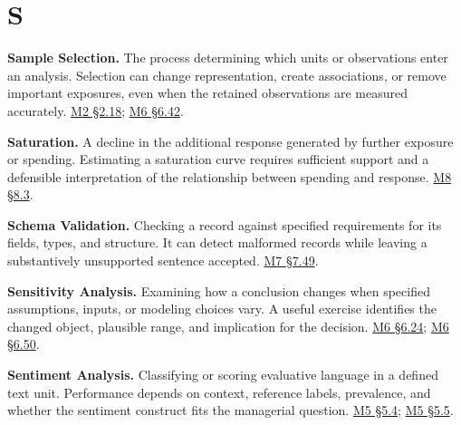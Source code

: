 \par{}
\hypertarget{module-s}{%
\section*{S}\label{module-s}}

\noindent\textbf{Sample Selection.} The process determining which units or
observations enter an analysis. Selection can change representation,
create associations, or remove important exposures, even when the
retained observations are measured accurately.
\href{Marketing_Analytics_Lecture_Notes.pdf\#M02-sample-restrictions-and-customer-representation}{M2
§2.18};
\href{Marketing_Analytics_Lecture_Notes.pdf\#M06-thoughtful-design-before-convenient-data}{M6
§6.42}.

\noindent\textbf{Saturation.} A decline in the additional response generated by
further exposure or spending. Estimating a saturation curve requires
sufficient support and a defensible interpretation of the relationship
between spending and response.
\href{Marketing_Analytics_Lecture_Notes.pdf\#M08-marketing-mix-models-combine-carryover-and-saturation}{M8
§8.3}.

\noindent\textbf{Schema Validation.} Checking a record against specified
requirements for its fields, types, and structure. It can detect
malformed records while leaving a substantively unsupported sentence
accepted.
\href{Marketing_Analytics_Lecture_Notes.pdf\#M07-record-checks-and-unsupported-conclusions}{M7
§7.49}.

\noindent\textbf{Sensitivity Analysis.} Examining how a conclusion changes when
specified assumptions, inputs, or modeling choices vary. A useful
exercise identifies the changed object, plausible range, and implication
for the decision.
\href{Marketing_Analytics_Lecture_Notes.pdf\#M06-overlap-weight-concentration-and-missing-confounders}{M6
§6.24};
\href{Marketing_Analytics_Lecture_Notes.pdf\#M06-bias-missing-outcomes-and-the-scope-of-reassurance}{M6
§6.50}.

\noindent\textbf{Sentiment Analysis.} Classifying or scoring evaluative language
in a defined text unit. Performance depends on context, reference
labels, prevalence, and whether the sentiment construct fits the
managerial question.
\href{Marketing_Analytics_Lecture_Notes.pdf\#M05-sentiment-aspect-labels-and-topic-models}{M5
§5.4};
\href{Marketing_Analytics_Lecture_Notes.pdf\#M05-case-study-a-complaint-detector-under-changing-prevalence}{M5
§5.5}.

